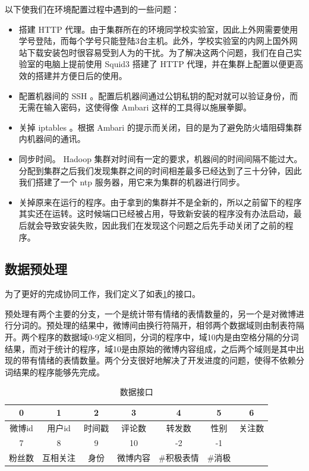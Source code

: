 \documentclass[12pt, oneside]{article}
\begin{document}
\begin{spacing}{1.5}
\begin{CJK}{UTF8}{gbsn}
以下使我们在环境配置过程中遇到的一些问题：
\begin{itemize}
	\item 搭建 HTTP 代理。由于集群所在的环境同学校实验室，因此上外网需要使用学号登陆，而每个学号只能登陆3台主机。此外，学校实验室的内网上国外网站下载安装包时很容易受到人为的干扰。为了解决这两个问题，我们在自己实验室的电脑上提前使用 Squid3 搭建了 HTTP 代理，并在集群上配置以便更高效的搭建并方便日后的使用。
	\item 配置机器间的 SSH 。配置后机器间通过公钥私钥的配对就可以验证身份，而无需在输入密码，这使得像 Ambari 这样的工具得以施展拳脚。
	\item 关掉 iptables 。根据 Ambari 的提示而关闭，目的是为了避免防火墙阻碍集群内机器间的通讯。
	\item 同步时间。 Hadoop 集群对时间有一定的要求，机器间的时间间隔不能过大。分配到集群之后我们发现集群之间的时间相差最多已经达到了三十分钟，因此我们搭建了一个 ntp 服务器，用它来为集群的机器进行同步。
	\item 关掉原来在运行的程序。由于拿到的集群并不是全新的，所以之前留下的程序其实还在运转。这时候端口已经被占用，导致新安装的程序没有办法启动，最后就会导致安装失败，因此我们在发现这个问题之后先手动关闭了之前的程序。
\end{itemize}

\subsection{数据预处理}
为了更好的完成协同工作，我们定义了如表\ref{tbl:interface}的接口。

预处理有两个主要的分支，一个是统计带有情绪的表情数量的，另一个是对微博进行分词的。预处理的结果中，微博间由换行符隔开，相邻两个数据域则由制表符隔开。两个程序的数据域0-9定义相同，分词的程序中，域10内是由空格分隔的分词结果，而对于统计的程序，域10是由原始的微博内容组成，之后两个域则是其中出现的带有情绪的表情数量。两个分支很好地解决了开发进度的问题，使得不依赖分词结果的程序能够先完成。


\begin{table}[]
\centering
\begin{tabular}{|c|c|c|c|c|c|c|}
\hline
0    & 1    & 2   & 3    & 4      & 5    & 6   \\ \hline
微博id & 用户id & 时间戳 & 评论数  & 转发数    & 性别   & 关注数 \\ \hline
7    & 8    & 9   & 10   & -2     & -1   &     \\ \hline
粉丝数  & 互相关注 & 身份  & 微博内容 & \#积极表情 & \#消极 &     \\ \hline
\end{tabular}
\caption{数据接口}
\label{tbl:interface}
\end{table}


\end{CJK}
\end{spacing}
\end{document}
